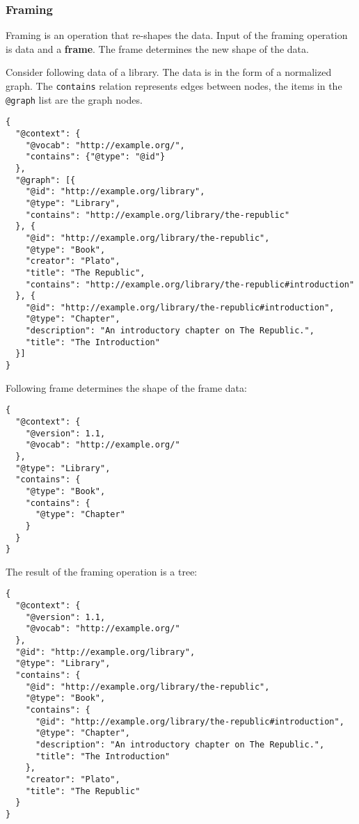 \subsubsection{Framing}\label{jsonldframing}

Framing is an operation that re-shapes the data. Input of the framing operation is data and a \textbf{frame}. The frame determines the new shape of the data.

Consider following data of a library. The data is in the form of a normalized graph. The \lstinline{contains} relation represents edges between nodes, the items in the \lstinline{@graph} list are the graph nodes.

\lstset{language=JSON}
\begin{lstlisting}[caption=Data of a library as normalized graph]
{
  "@context": {
    "@vocab": "http://example.org/",
    "contains": {"@type": "@id"}
  },
  "@graph": [{
    "@id": "http://example.org/library",
    "@type": "Library",
    "contains": "http://example.org/library/the-republic"
  }, {
    "@id": "http://example.org/library/the-republic",
    "@type": "Book",
    "creator": "Plato",
    "title": "The Republic",
    "contains": "http://example.org/library/the-republic#introduction"
  }, {
    "@id": "http://example.org/library/the-republic#introduction",
    "@type": "Chapter",
    "description": "An introductory chapter on The Republic.",
    "title": "The Introduction"
  }]
}
\end{lstlisting}

Following frame determines the shape of the frame data:

\lstset{language=JSON}
\begin{lstlisting}[caption=Frame for the framing operation]
{
  "@context": {
    "@version": 1.1,
    "@vocab": "http://example.org/"
  },
  "@type": "Library",
  "contains": {
    "@type": "Book",
    "contains": {
      "@type": "Chapter"
    }
  }
}
\end{lstlisting}

The result of the framing operation is a tree:

\lstset{language=JSON}
\begin{lstlisting}[caption=Framed data of a library]
{
  "@context": {
    "@version": 1.1,
    "@vocab": "http://example.org/"
  },
  "@id": "http://example.org/library",
  "@type": "Library",
  "contains": {
    "@id": "http://example.org/library/the-republic",
    "@type": "Book",
    "contains": {
      "@id": "http://example.org/library/the-republic#introduction",
      "@type": "Chapter",
      "description": "An introductory chapter on The Republic.",
      "title": "The Introduction"
    },
    "creator": "Plato",
    "title": "The Republic"
  }
}
\end{lstlisting}

